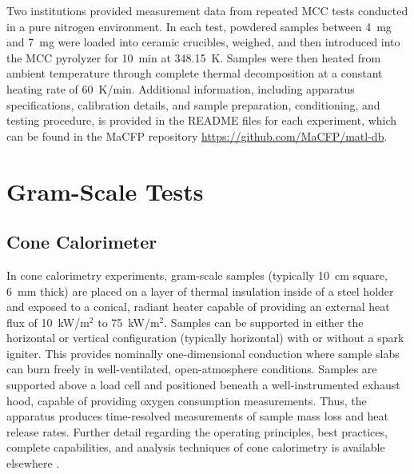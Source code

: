 \documentclass{book}
\begin{document}
Two institutions provided measurement data from repeated MCC tests conducted in a pure nitrogen environment. In each test, powdered samples between 4~mg and 7~mg were loaded into ceramic crucibles, weighed, and then introduced into the MCC pyrolyzer for 10~min at 348.15~K. Samples were then heated from ambient temperature through complete thermal decomposition at a constant heating rate of 60~K/min. Additional information, including  apparatus specifications, calibration details, and sample preparation, conditioning, and testing procedure, is provided in the README files for each experiment, which can be found in the MaCFP repository \href{https://github.com/MaCFP/matl-db}{https://github.com/MaCFP/matl-db}.

\section{Gram-Scale Tests}
\label{g_tests}

\subsection{Cone Calorimeter}

In cone calorimetry experiments, gram-scale samples (typically 10~cm square, 6~mm thick) are placed on a layer of thermal insulation inside of a steel holder and exposed to a conical, radiant heater capable of providing an external heat flux of 10~kW/m$^2$ to 75~kW/m$^2$. Samples can be supported in either the horizontal or vertical configuration (typically horizontal) with or without a spark igniter. This provides nominally one-dimensional conduction where sample slabs can burn freely in well-ventilated, open-atmosphere conditions. Samples are supported above a load cell and positioned beneath a well-instrumented exhaust hood, capable of providing oxygen consumption measurements. Thus, the apparatus produces time-resolved measurements of sample mass loss and heat release rates. Further detail regarding the operating principles, best practices, complete capabilities, and analysis techniques of cone calorimetry is available elsewhere \cite{babrauskas1984development, SFPEHandbookCone, astm1354standard}.
\end{document}

